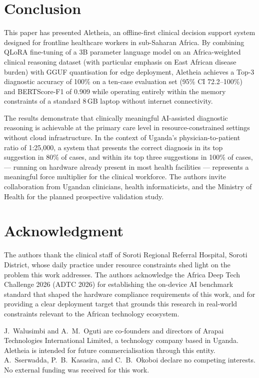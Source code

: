 \documentclass[conference]{IEEEtran}
\begin{document}
\section{Conclusion}
\label{sec:conclusion}

This paper has presented Aletheia, an offline-first clinical
decision support system designed for frontline healthcare workers
in sub-Saharan Africa. By combining QLoRA fine-tuning of a 3B
parameter language model on an Africa-weighted clinical reasoning dataset
(with particular emphasis on East African disease burden) with GGUF quantisation for edge deployment,
Aletheia achieves a Top-3 diagnostic accuracy of 100\% on a
ten-case evaluation set (95\% CI 72.2--100\%) and
BERTScore-F1 of 0.909 while operating entirely within the memory
constraints of a standard 8\,GB laptop without internet
connectivity.

The results demonstrate that clinically meaningful AI-assisted
diagnostic reasoning is achievable at the primary care level in
resource-constrained settings without cloud infrastructure. In
the context of Uganda's physician-to-patient ratio of 1:25{,}000,
a system that presents the correct diagnosis in its top suggestion
in 80\% of cases, and within its top three suggestions in 100\% of cases, --- running on hardware already present in most
health facilities --- represents a meaningful force multiplier for
the clinical workforce.
The authors invite collaboration from Ugandan
clinicians, health informaticists, and the Ministry of Health for
the planned prospective validation study.

\section*{Acknowledgment}

The authors thank the clinical staff of Soroti Regional Referral
Hospital, Soroti District, whose daily practice under resource
constraints shed light on the problem this work addresses. The authors acknowledge the Africa Deep
Tech Challenge 2026 (ADTC 2026) for establishing the on-device
AI benchmark standard that shaped the hardware compliance
requirements of this work, and for providing a clear deployment
target that grounds this research in real-world constraints
relevant to the African technology ecosystem.

J.~Walusimbi and A.~M.~Oguti are co-founders and directors of
Arapai Technologies International Limited, a technology company
based in Uganda. Aletheia is intended for future commercialisation
through this entity. A.~Sserwadda, P.~B.~Kasasira, and
C.~B.~Okoboi declare no competing interests. No external funding
was received for this work.
\end{document}
